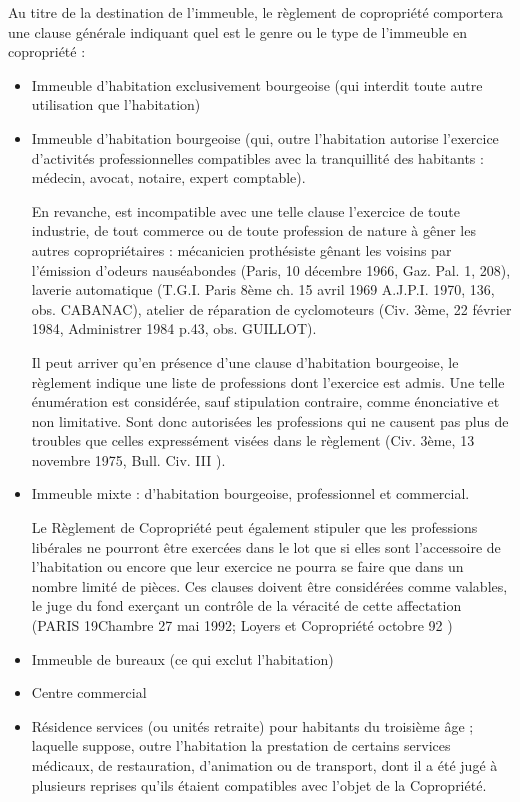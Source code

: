 				Au titre de la destination de l'immeuble, le règlement de copropriété comportera une clause générale indiquant quel est le genre ou le type de l'immeuble en copropriété :
				\begin{itemize}
					\item Immeuble d'habitation exclusivement bourgeoise (qui interdit toute autre utilisation que l'habitation)
					
					\item Immeuble d'habitation bourgeoise (qui, outre l'habitation autorise l'exercice d'activités professionnelles compatibles avec la tranquillité des habitants : médecin, avocat, notaire, expert comptable).
					
					En revanche, est incompatible avec une telle clause l'exercice de toute industrie, de tout commerce ou de toute profession de nature à gêner les autres copropriétaires : mécanicien prothésiste gênant les voisins par l'émission d'odeurs nauséabondes (Paris, 10 décembre 1966, Gaz. Pal. 1, 208), laverie automatique (T.G.I. Paris 8ème ch. 15 avril 1969 A.J.P.I. 1970, 136, obs. CABANAC), atelier de réparation de cyclomoteurs (Civ. 3ème, 22 février 1984, Administrer 1984 p.43, obs. GUILLOT).
					
					Il peut arriver qu'en présence d'une clause d'habitation bourgeoise, le règlement indique une liste de professions dont l'exercice est admis. Une telle énumération est considérée, sauf stipulation contraire, comme énonciative et non limitative. Sont donc autorisées les professions qui ne causent			
					pas plus de troubles que celles expressément visées dans le règlement (Civ. 3ème, 13 novembre 1975, Bull. Civ. III ).
					
					\item Immeuble mixte : d'habitation bourgeoise, professionnel et commercial.
					
					Le Règlement de Copropriété peut également stipuler que les professions libérales ne pourront être exercées dans le lot que si elles sont l'accessoire de l'habitation ou encore que leur exercice ne pourra se faire que dans un nombre limité de pièces. Ces clauses doivent être considérées comme valables, le juge du fond exerçant un contrôle de la véracité de cette affectation (PARIS 19\degres Chambre 27 mai 1992; Loyers et Copropriété octobre 92 )
					
					\item Immeuble de bureaux (ce qui exclut l'habitation)
					
					\item Centre commercial
					
					\item Résidence services (ou unités retraite) pour habitants du troisième âge ; laquelle suppose, outre l'habitation la prestation de certains services médicaux, de restauration, d'animation ou de transport, dont il a été jugé à plusieurs reprises qu'ils étaient compatibles avec l'objet de la Copropriété.
				\end{itemize}
			
